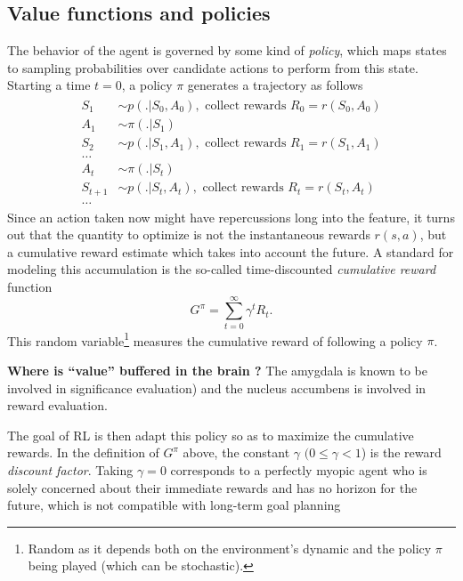 \documentclass[10pt,letterpaper]{article}
\begin{document}
\subsection{Value functions and policies}
The behavior of the agent is governed by some kind of \textit{policy}, which maps states to
sampling probabilities over candidate actions to perform from this state. Starting a time $t=0$,
a policy $\pi$ generates a trajectory as follows
\begin{eqnarray*}
  \begin{split}
    S_1 &\sim p(.|S_0,A_0), \text{ collect rewards }R_0 = r(S_0, A_0)\\
    A_1 &\sim \pi(.|S_1)\\
    S_2 &\sim p(.|S_1,A_1), \text{ collect rewards }R_1 = r(S_1, A_1)\\
    \ldots\\
    A_{t} &\sim \pi(.|S_{t})\\
    S_{t+1} &\sim p(.|S_{t},A_{t}), \text{ collect rewards }R_{t} = r(S_{t}, A_{t})\\
    \ldots
  \end{split}
\end{eqnarray*}
Since an action taken now might have repercussions long into the feature, it turns out that the
quantity to optimize is not the instantaneous rewards $r(s, a)$, but a
cumulative reward estimate which takes into account the future. A standard for
modeling this accumulation is the so-called
time-discounted \textit{cumulative reward} function
\begin{equation}
  \label{eq:cumr}
  G^\pi = \sum_{t=0}^{\infty}\gamma^{t}R_t.
\end{equation}
This random variable\footnote{Random as it depends both on the environment's dynamic and the
  policy $\pi$ being played (which can be stochastic).}  measures the cumulative reward of
following a
policy $\pi$.
\begin{mdframed}
  \textbf{Where is ``value'' buffered in the brain ?}
  The amygdala is known to be involved in significance evaluation) and
  the nucleus accumbens is involved in reward evaluation.
  \end{mdframed}
The  goal of RL is then adapt this policy so as to  maximize the cumulative rewards.
In the definition of $G^\pi$ above, the constant $\gamma$ $(0 \le \gamma < 1$) is the reward \textit{discount factor}.
Taking $\gamma = 0$   corresponds to a perfectly myopic agent who is solely concerned about their
immediate rewards and has no horizon for the future, which is not compatible with long-term goal planning
\end{document}
